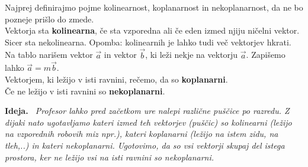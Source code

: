 \documentclass[a4paper,11pt]{article}
\newenvironment{ide}{%
  \par\medskip\noindent\textbf{Ideja.}\itshape\ }{\par\medskip}
\begin{document}
\noindent Najprej definirajmo pojme kolinearnost, koplanarnost in nekoplanarnost, da ne bo pozneje prišlo do zmede.\\
Vektorja sta \textbf{kolinearna}, če sta vzporedna ali če eden izmed njiju ničelni vektor. Sicer sta nekolinearna. Opomba: kolinearnih je lahko tudi več vektorjev hkrati.
Na tablo narišem vektor $\vec{a}$ in vektor $\vec{b}$, ki leži nekje na vektorju $\vec{a}$. Zapišemo lahko $\vec{a}=m\vec{b}$.\\
Vektorjem, ki ležijo v isti ravnini, rečemo, da so \textbf{koplanarni}. \\
Če ne ležijo v isti ravnini so \textbf{nekoplanarni}.
\begin{ide}
    Profesor lahko pred začetkom ure nalepi različne puščice po razredu. Z dijaki nato ugotavljamo kateri izmed teh vektorjev (puščic) so kolinearni (ležijo na vzporednih robovih miz npr.), kateri koplanarni (ležijo na istem zidu, na tleh,..) in kateri nekoplanarni. Ugotovimo, da so vsi vektorji skupaj del istega prostora, ker ne ležijo vsi na isti ravnini so nekoplanarni.
\end{ide}
\end{document}

